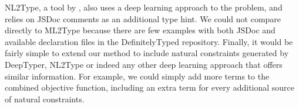 \documentclass[sigplan,10pt,review,anonymous]{acmart} %
\newcommand{\prodts}{\textsc{ProdTS}\xspace}
\theoremstyle{plain}
\theoremstyle{remark}
\theoremstyle{definition}
\begin{document}
NL2Type, a tool by \cite{malik19}, also uses
a deep learning approach to the problem, and  relies on JSDoc comments as
an additional type hint.
%
We could not compare directly to ML2Type because 
there are few examples with both JSDoc and available declaration
files in the DefinitelyTyped repository.
%
Finally, it would be fairly simple to extend our method to include natural constraints generated by DeepTyper, NL2Type or
indeed any other deep learning approach that offers similar information.
For example, we could simply add more terms to the combined objective function,
including an extra term for every additional source of natural constraints.


\end{document}
